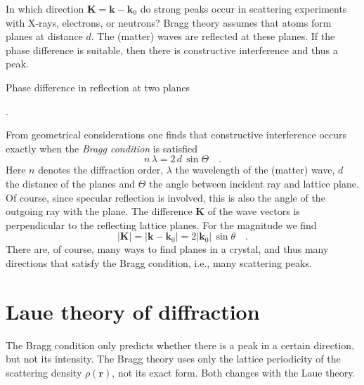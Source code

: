 In which direction $\mathbf{K} = \mathbf{k} - \mathbf{k}_0$ do strong peaks occur in scattering experiments with X-rays, electrons, or neutrons? Bragg theory assumes that atoms form planes at distance $d$. The (matter) waves are reflected at these planes. If the phase difference is suitable, then there is constructive interference and thus a peak.


\begin{marginfigure}

\caption{Phase difference in reflection at two planes}.
\end{marginfigure}


From geometrical considerations one finds that constructive interference occurs exactly when the \emph{Bragg condition} is satisfied
\begin{equation}
n \, \lambda = 2 \, d \, \sin \Theta \quad .
\end{equation}
Here $n$ denotes the diffraction order, $\lambda$ the wavelength of the (matter) wave, $d$ the distance of the planes and $\Theta$ the angle between incident ray and lattice plane. Of course, since specular reflection is involved, this is also the angle of the outgoing ray with the plane. The difference 
$\mathbf{K}$ of the wave vectors is perpendicular to the reflecting lattice planes. For the magnitude we find
\begin{equation}
|\mathbf{K}| = |\mathbf{k} - \mathbf{k}_0| = 2 | \mathbf{k}_0| \, \sin \theta \quad .
\label{eq:4_def_k_sin_theta}
\end{equation}
There are, of course, many ways to find planes in a crystal, and thus many directions that satisfy the Bragg condition, i.e., many scattering peaks.
 
 
\section{Laue theory of diffraction} 
 
The Bragg condition only predicts whether there is a peak in a certain direction, but not its intensity. The Bragg theory uses only the lattice periodicity of the scattering density $\rho( \mathbf{r})$, not its exact form. Both changes with the Laue theory.


